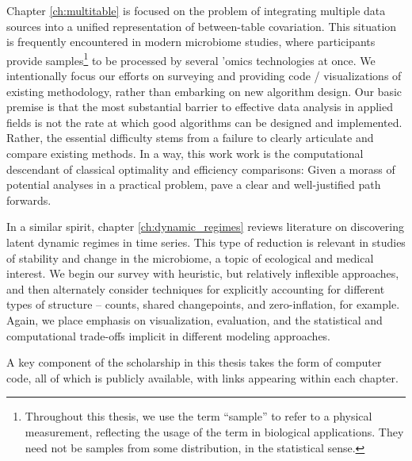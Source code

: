 Chapter \ref{ch:multitable} is focused on the problem of integrating multiple
data sources into a unified representation of between-table covariation. This
situation is frequently encountered in modern microbiome studies, where
participants provide samples\footnote{Throughout this thesis, we use the term
  ``sample'' to refer to a physical measurement, reflecting the usage of the
  term in biological applications. They need not be samples from some
  distribution, in the statistical sense.} to be processed by several 'omics
technologies at once. We intentionally focus our efforts on surveying and
providing code / visualizations of existing methodology, rather than embarking
on new algorithm design. Our basic premise is that the most substantial barrier
to effective data analysis in applied fields is not the rate at which good
algorithms can be designed and implemented. Rather, the essential difficulty
stems from a failure to clearly articulate and compare existing methods. In a
way, this work work is the computational descendant of classical optimality and
efficiency comparisons: Given a morass of potential analyses in a practical
problem, pave a clear and well-justified path forwards.

In a similar spirit, chapter \ref{ch:dynamic_regimes} reviews literature on
discovering latent dynamic regimes in time series. This type of reduction is
relevant in studies of stability and change in the microbiome, a topic of
ecological and medical interest. We begin our survey with heuristic, but
relatively inflexible approaches, and then alternately consider techniques for
explicitly accounting for different types of structure -- counts, shared
changepoints, and zero-inflation, for example. Again, we place emphasis on
visualization, evaluation, and the statistical and computational trade-offs
implicit in different modeling approaches.

A key component of the scholarship in this thesis takes the form of computer
code, all of which is publicly available, with links appearing within each
chapter.
